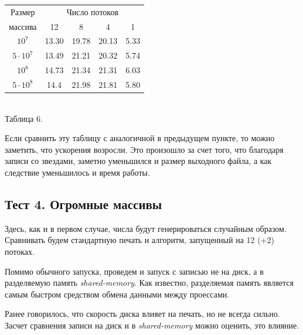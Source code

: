 \begin{center}
\begin{tabular}{||c|c|c|c|c||}
\hline
\hline
Размер & \multicolumn{4}{c|}{Число потоков}\\
\hhline{~|-|-|-|-|}
массива & 12 & 8 & 4 & 1 \\
\hline
$10^7$  & 13.30 & 19.78 & 20.13 & 5.33 \\
\hline
$5 \cdot 10^7$ & 13.49 & 21.21 & 20.32 & 5.74 \\
\hline
$10^8$ &14.73 & 21.34 & 21.31 & 6.03 \\
\hline
$5 \cdot 10^8$ &14.4 & 21.98 & 21.81 & 5.80 \\
\hline
\hline
\end{tabular}
\\\vspace{10pt}
\small{Таблица 6.}
\end{center}

Если сравнить эту таблицу с аналогичной в предыдущем пункте, то можно заметить, что ускорения возросли.
Это произошло за счет того, что благодаря записи со звездами, заметно уменьшился и размер выходного файла, а как следствие уменьшилось и время работы.

\subsection{Тест 4. Огромные массивы} \label{subsec2:3}
Здесь, как и в первом случае, числа будут генерироваться случайным образом.
Сравнивать будем стандартную печать и алгоритм, запущенный на 12 (+2) потоках.

Помимо обычного запуска, проведем и запуск с записью не на диск, а в разделяемую память \textit{shared-memory}.
Как известно, разделяемая память является самым быстром средством обмена данными между проессами.

Ранее говорилось, что скорость диска влияет на печать, но не всегда сильно.
Засчет сравнения записи на диск и в \textit{shared-memory} можно оценить, это влияние.

